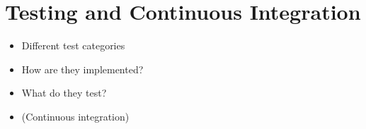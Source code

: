\section{Testing and Continuous Integration}
\begin{itemize}
    \item Different test categories
    \item How are they implemented?
    \item What do they test?
    \item (Continuous integration) 
\end{itemize}